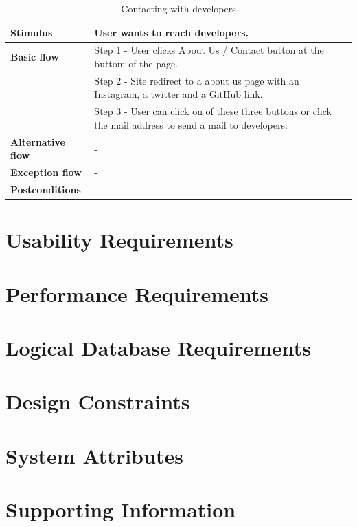 \begin{center}
\begin{table}[H]
\begin{tabular}{| m{3cm}| m{10cm} |}
            \hline
            \textbf{Stimulus} & User wants to reach developers. \\
            \hline
            \textbf{Basic flow} & Step 1 - User clicks About Us / Contact button at the buttom of the page.\\
                                & Step 2 - Site redirect to a about us page with an Instagram, a twitter and a GitHub link.\\
                                & Step 3 - User can click on of these three buttons or click the mail address to send a mail to developers.\\
            \hline
            \textbf{Alternative flow} & - \\
            \hline
            \textbf{Exception flow} &  -\\
            \hline
            \textbf{Postconditions} & -\\
            \hline
        \end{tabular}
        \caption[Contacting with developers]{Contacting with developers}
    \end{table}
\end{center}

\section{Usability Requirements}

\section{Performance Requirements}

\section{Logical Database Requirements}

\section{Design Constraints}

\section{System Attributes}

\section{Supporting Information}
